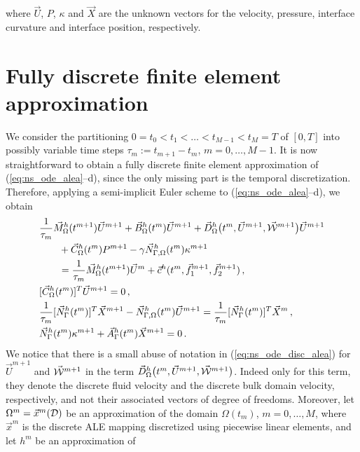 where $\vec U$, $P$, $\kappa$ and $\vec X$ are the unknown vectors for the
velocity, pressure, interface curvature and interface position, respectively.

\section{Fully discrete finite element approximation}\label{sec:ale_fem}
We consider the partitioning  $0= t_0 < t_1 < \ldots < t_{M-1} < t_M = T$ of
$[0,T]$ into possibly variable time steps $\tau_m := t_{m+1}-t_m$, $m=0, \ldots,
M-1$. It is now straightforward to obtain a fully discrete finite element
approximation of (\ref{eq:ns_ode_alea}--d), since the only missing part is the
temporal discretization. Therefore, applying a semi-implicit Euler scheme to
(\ref{eq:ns_ode_alea}--d), we obtain
\begin{subequations}
\begin{align}
& \frac{1}{\tau_m}\vec M^h_\Omega(t^{m+1})\vec U^{m+1} +
\vec B^h_\Omega(t^m) \vec U^{m+1} +
\vec D^h_\Omega\big(t^m,\vec U^{m+1},\vec{\mathcal W}^{m+1}\big)\vec U^{m+1} \nonumber \\
& \qquad + \vec C^h_\Omega(t^m) P^{m+1}
- \gamma \vec{N}_{\Gamma,\Omega}^h(t^m) \kappa^{m+1} \nonumber \\
& \qquad = \frac{1}{\tau_m} \vec M^h_\Omega(t^{m+1})\vec U^m
+ \vec c^h(t^m,\vec f_1^{m+1},\vec f_2^{m+1})\,,\label{eq:ns_ode_disc_alea} \\
& [\vec C^h_\Omega(t^m) ]^T \vec U^{m+1} = 0\,,
\label{eq:ns_ode_disc_aleb} \\
& \frac{1}{\tau_m}[\vec N_\Gamma^h(t^m)]^T \vec X^{m+1}
- \vec{N}_{\Gamma,\Omega}^h(t^m)\vec U^{m+1} = \frac{1}{\tau_m}[\vec N_\Gamma^h(t^m)]^T
\vec X^m\,, \label{eq:ns_ode_disc_alec}\\
& \vec N_\Gamma^h(t^m) \kappa^{m+1} + \vec A^h_\Gamma(t^m)\vec X^{m+1}
 = 0\,. \label{eq:ns_ode_disc_aled}
\end{align}
\end{subequations}
We notice that there is a small abuse of notation in (\ref{eq:ns_ode_disc_alea})
for $\vec U^{m+1}$ and $\vec{\mathcal W}^{m+1}$ in the term $\vec D^h_\Omega\big(t^{m},\vec
U^{m+1},\vec{\mathcal W}^{m+1}\big)$. Indeed only for this term, they denote the discrete
fluid velocity and the discrete bulk domain velocity, respectively, and not
their associated vectors of degree of freedoms. Moreover, let
$\Omega^m=\vec x^m(\mathcal D)$ be an approximation of the domain $\Omega(t_m)$, $m=0
,\ldots, M$, where $\vec x^m$ is the discrete ALE mapping discretized using
piecewise linear elements, and let $h^m$ be an approximation of
